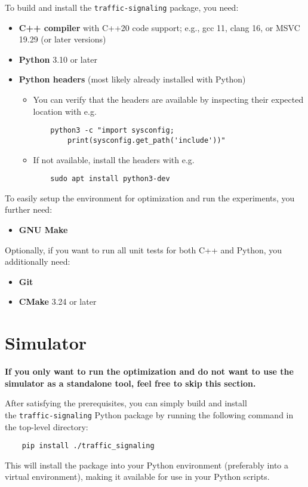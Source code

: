 To build and install the \verb|traffic-signaling| package, you need:
\begin{itemize}
    \item \textbf{C++ compiler} with C++20 code support; e.g., gcc 11, clang 16, or MSVC 19.29 (or later versions)
    \item \textbf{Python} 3.10 or later
    \item \textbf{Python headers} (most likely already installed with Python)
    \begin{itemize}
        \item You can verify that the headers are available by inspecting their expected location with e.g.
\begin{verbatim}
    python3 -c "import sysconfig;
        print(sysconfig.get_path('include'))"
\end{verbatim}
        \item If not available, install the headers with e.g.
\begin{verbatim}
    sudo apt install python3-dev
\end{verbatim}
    \end{itemize}
\end{itemize}
To easily setup the environment for optimization and run the experiments, you further need:
\begin{itemize}
    \item \textbf{GNU Make}
\end{itemize}
Optionally, if you want to run all unit tests for both C++ and Python, you additionally need:
\begin{itemize}
    \item \textbf{Git}
    \item \textbf{CMake} 3.24 or later
\end{itemize}

\newpage

\section{Simulator}

\textbf{If you only want to run the optimization and do not want to use the simulator as a standalone tool, feel free to skip this section.}

\bigskip

After satisfying the prerequisites, you can simply build and install \\
the \verb|traffic-signaling| Python package by running the following command in the top-level directory:
\begin{verbatim}
    pip install ./traffic_signaling
\end{verbatim}
This will install the package into your Python environment (preferably into a virtual environment), making it available for use in your Python scripts.

